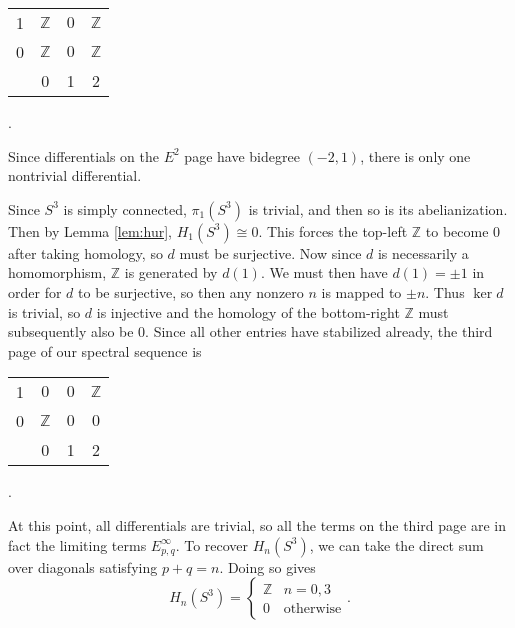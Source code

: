 \documentclass[twoside,10pt]{article}
\begin{document}
\begin{ex}
	\begin{center}
		\begin{tabular}{ c | c c c }
			1 & $\mathbb{Z}$ & $0$ &$\mathbb{Z}$\\
			0 & $\mathbb{Z}$ & $0$ &$\mathbb{Z}$\\
			\hline
			  & 0 & 1 & 2
		\end{tabular}.
	\end{center}
	Since differentials on the $E^{2}$ page have bidegree $(-2,1)$, there is only one nontrivial differential.
	\begin{center}
	\end{center}
	Since $S^{3}$ is simply connected, $\pi_1(S^{3})$ is trivial, and then so is its abelianization. Then by Lemma \ref{lem:hur}, $H_{1}(S^{3}) \cong 0$. This forces the top-left $\mathbb{Z}$ to become 0 after taking homology, so $d$ must be surjective. Now since $d$ is necessarily a homomorphism, $\mathbb{Z}$ is generated by $d(1)$. We must then have $d(1) = \pm 1$ in order for $d$ to be surjective, so then any nonzero $n$ is mapped to $\pm n$. Thus $\ker d$ is trivial, so $d$ is injective and the homology of the bottom-right $\mathbb{Z}$ must subsequently also be 0. Since all other entries have stabilized already, the third page of our spectral sequence is
	\begin{center}
                \begin{tabular}{ c | c c c }
                        1 & $0$ & $0$ &$\mathbb{Z}$\\
                        0 & $\mathbb{Z}$ & $0$ &$0$\\
                        \hline
                          & 0 & 1 & 2
                \end{tabular}.
        \end{center}
	At this point, all differentials are trivial, so all the terms on the third page are in fact the limiting terms $E_{p,q}^{\infty}$. To recover $H_{n}(S^{3})$, we can take the direct sum over diagonals satisfying $p+q=n$. Doing so gives
	\[
		H_{n}(S^{3}) =
		\begin{cases}
			\mathbb{Z} & n=0,3\\
			0 &\text{otherwise}
		\end{cases}.
	\] 
\end{ex}



\nocite{mccleary}
\nocite{chow}
\nocite{df}
\nocite{weibel}
\nocite{rotman}

\printbibliography
\end{document}
